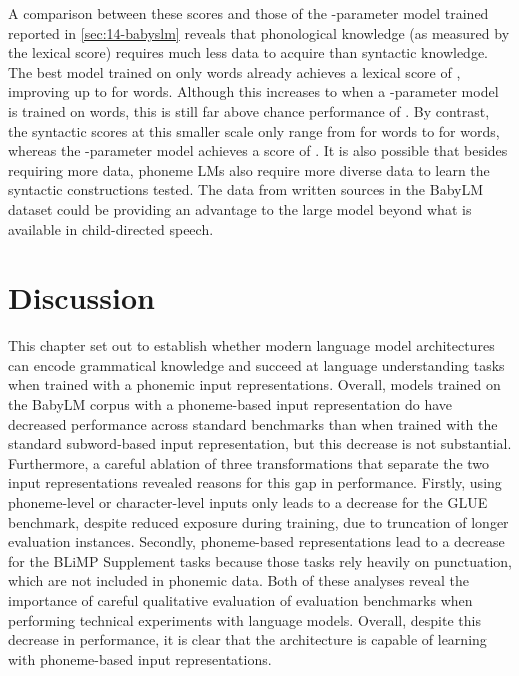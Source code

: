 A comparison between these scores and those of the -parameter model trained reported in \cref{sec:14-babyslm} reveals that phonological knowledge (as measured by the lexical score) requires much less data to acquire than syntactic knowledge. The best model trained on only  words already achieves a lexical score of , improving up to  for  words. Although this increases to  when a -parameter model is trained on  words, this is still far above chance performance of . By contrast, the syntactic scores at this smaller scale only range from  for  words to  for  words, whereas the -parameter model achieves a score of . It is also possible that besides requiring more data, phoneme LMs also require more diverse data to learn the syntactic constructions tested. The data from written sources in the BabyLM dataset could be providing an advantage to the large model beyond what is available in child-directed speech.

\section{Discussion}\label{sec:14-discussion}

This chapter set out to establish whether modern language model architectures can encode grammatical knowledge and succeed at language understanding tasks when trained with a phonemic input representations. Overall, \gpt models trained on the BabyLM corpus with a phoneme-based input representation do have decreased performance across standard benchmarks than when trained with the standard subword-based input representation, but this decrease is not substantial. Furthermore, a careful ablation of three transformations that separate the two input representations revealed reasons for this gap in performance. Firstly, using phoneme-level or character-level inputs only leads to a decrease for the GLUE benchmark, despite reduced exposure during training, due to truncation of longer evaluation instances. Secondly, phoneme-based representations lead to a decrease for the BLiMP Supplement tasks because those tasks rely heavily on punctuation, which are not included in phonemic data. Both of these analyses reveal the importance of careful qualitative evaluation of evaluation benchmarks when performing technical experiments with language models. Overall, despite this decrease in performance, it is clear that the \gpt architecture is capable of learning with phoneme-based input representations.

